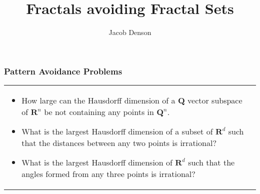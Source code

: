 \documentclass[usenames,dvipsnames]{beamer}
\title{Fractals avoiding Fractal Sets}
\author{Jacob Denson}
\institute{University of British Columbia}
\begin{document}
\maketitle

\begin{frame}
  \frametitle{Pattern Avoidance Problems}

\begin{tabular}{p{}p{}}

\begin{itemize}
    \item How large can the Hausdorff dimension of a $\mathbf{Q}$ vector subspace of $\mathbf{R}^n$ be not containing any points in $\mathbf{Q}^n$.

     \item What is the largest Hausdorff dimension of a subset of $\mathbf{R}^d$ such that the distances between any two points is irrational?

     \item What is the largest Hausdorff dimension of $\mathbf{R}^d$ such that the angles formed from any three points is irrational?
\end{itemize}

\end{tabular}

\end{frame}
\end{document}
